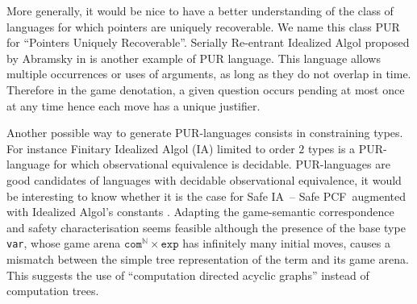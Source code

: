 \documentclass{llncs}
\newcommand\nat{\mathbb{N}}
\newcommand\ialgol{\textsf{IA}}
\newcommand\iacom{\texttt{com}}
\newcommand\iaexp{\texttt{exp}}
\newcommand\iavar{\texttt{var}}
\newcommand\pcf{\textsf{PCF}}
\begin{document}
More generally, it would be nice to have a better understanding of the class of languages for
which pointers are uniquely recoverable. We name this class PUR for
``Pointers Uniquely Recoverable''.
Serially Re-entrant Idealized Algol proposed
by Abramsky  in \cite{abramsky:mchecking_ia}
is another example of PUR language. This language allows
multiple occurrences or uses of arguments, as long as they do not
overlap in time. Therefore in the game denotation, a given question occurs pending at most once at any time
hence each move has a unique justifier.

Another possible way to generate PUR-languages consists in constraining
types. For instance Finitary Idealized Algol (\ialgol) limited to order $2$ types is a PUR-language for which
observational equivalence is decidable.
PUR-languages are good candidates of languages with decidable observational equivalence, it would
be interesting to know whether it is the case for Safe \ialgol\ -- Safe \pcf\ augmented with Idealized Algol's constants \cite{Reynolds81}.
Adapting the game-semantic correspondence and safety characterisation
seems feasible although the presence of the base type \iavar, whose
game arena $\iacom^{\nat} \times \iaexp$ has infinitely many initial moves, causes
a mismatch between the simple tree representation of the term and its game arena. This suggests the use of ``computation directed acyclic graphs'' instead of computation trees.
\end{document}
